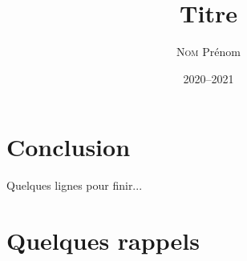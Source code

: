 \documentclass[12pt,a4paper]{memoire-umons}
\title{Titre}
\author{\textsc{Nom} Prénom}
\date{2020--2021}
\begin{document}
\maketitle

\tableofcontents






\chapter*{Conclusion}

Quelques lignes pour finir...

\appendix
\chapter{Quelques rappels}


\printbibliography
\end{document}

